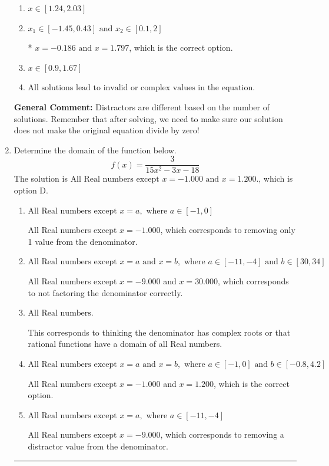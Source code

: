 \documentclass{extbook}[14pt]
\newcommand{\litem}[1]{\item #1

\rule{\textwidth}{0.4pt}}
\begin{document}
\begin{enumerate}
{\begin{enumerate}[label=\Alph*.]
\item \( x \in [1.24,2.03] \)


\item \( x_1 \in [-1.45, 0.43] \text{ and } x_2 \in [0.1,2] \)

* $x = -0.186 \text{ and } x = 1.797$, which is the correct option.
\item \( x \in [0.9,1.67] \)


\item \( \text{All solutions lead to invalid or complex values in the equation.} \)


\end{enumerate}

\textbf{General Comment:} Distractors are different based on the number of solutions. Remember that after solving, we need to make sure our solution does not make the original equation divide by zero!
}
\litem{
Determine the domain of the function below.
\[ f(x) = \frac{3}{15x^{2} -3 x -18} \]
The solution is \( \text{All Real numbers except } x = -1.000 \text{ and } x = 1.200. \), which is option D.\begin{enumerate}[label=\Alph*.]
\item \( \text{All Real numbers except } x = a, \text{ where } a \in [-1, 0] \)

All Real numbers except $x = -1.000$, which corresponds to removing only 1 value from the denominator.
\item \( \text{All Real numbers except } x = a \text{ and } x = b, \text{ where } a \in [-11, -4] \text{ and } b \in [30, 34] \)

All Real numbers except $x = -9.000$ and $x = 30.000$, which corresponds to not factoring the denominator correctly.
\item \( \text{All Real numbers.} \)

This corresponds to thinking the denominator has complex roots or that rational functions have a domain of all Real numbers.
\item \( \text{All Real numbers except } x = a \text{ and } x = b, \text{ where } a \in [-1, 0] \text{ and } b \in [-0.8, 4.2] \)

All Real numbers except $x = -1.000$ and $x = 1.200$, which is the correct option.
\item \( \text{All Real numbers except } x = a, \text{ where } a \in [-11, -4] \)

All Real numbers except $x = -9.000$, which corresponds to removing a distractor value from the denominator.
\end{enumerate}

}
\end{enumerate}
\end{document}

